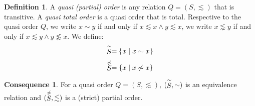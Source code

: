 \documentclass[12pt]{article}
\theoremstyle{definition}
\newtheorem{definition}{Definition}[section]
\theoremstyle{theorem}
\newtheorem{consequence}{Consequence}[section]
\def\aset#1{\left\{{#1}\right\}}
\begin{document}
\begin{definition}
  A \emph{quasi (partial) order} is any relation $Q=(S, \lesssim)$ that is transitive.
  A \emph{quasi total order} is a quasi order that is total.
  Respective to the quasi order $Q$, we write \( x \sim y \) if and only if \( x \lesssim x \wedge y \lesssim x \), we write \( x \lnsim y \) if and only if \( x \lesssim y \wedge y \not\lesssim x \).  We define:
  \[ \SimHat{S} = \aset{x \mid x \sim x} \]
  \[ \NotSimHat{S} = \aset{x \mid x \not\sim x } \]
\end{definition}
\begin{consequence}
  For a quasi order $Q=(S, \lesssim)$, \((\stackrel{\sim}{S},\sim)\) is an equivalence relation and 
  \((\stackrel{\not\sim}{S},\lesssim)\) is a (strict) partial order.
\end{consequence}
\end{document}

